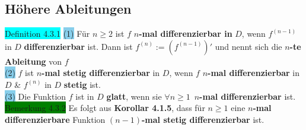 \documentclass[landscape, 10pt]{article}
\begin{document}
\begin{multicols}{3}
       \subsection{Höhere Ableitungen}
              \colorbox{cyan}{Definition 4.3.1} 
                     \colorbox{SkyBlue}{(1)}
                            Für \textcolor{NavyBlue}{
                            $n\geqslant2$} ist 
                            \textcolor{NavyBlue}{$f$}
                            $n$\textbf{-mal differenzierbar 
                            in} \textcolor{NavyBlue}{$D$}, wenn 
                            \textcolor{NavyBlue}{
                            $f^{(n-1)}$} in 
                            \textcolor{NavyBlue}{$D$}
                            \textbf{differenzierbar} ist. 
                            Dann ist 
                            \textcolor{NavyBlue}{
                            $f^{(n)}:=(f^{(n-1)})'$} 
                            und nennt sich die 
                            $n$\textbf{-te Ableitung} von 
                            \textcolor{NavyBlue}{$f$}\\
                     \colorbox{SkyBlue}{(2)} 
                            \textcolor{NavyBlue}{$f$} 
                            ist $n$\textbf{-mal stetig 
                            differenzierbar} in 
                            \textcolor{NavyBlue}{$D$}, 
                            wenn \textcolor{NavyBlue}{$f$} 
                            \textbf{$n$-mal differenzierbar} in
                            \textcolor{NavyBlue}{$D$}
                            \& \textcolor{NavyBlue}{$f^{(n)}$} 
                            in \textcolor{NavyBlue}{$D$} 
                            \textbf{stetig} ist.\\
                     \colorbox{SkyBlue}{(3)} 
                            Die Funktion \textcolor{NavyBlue}{$f$} 
                            ist in \textcolor{NavyBlue}{$D$} 
                            \textbf{glatt}, wenn sie 
                            \textcolor{NavyBlue}{
                            $\forall n\geqslant1$}\,
                            \textbf{$n$-mal 
                            differenzierbar} ist.\\
              \colorbox{green}{Bemerkung 4.3.2} 
                     Es folgt aus \textbf{Korollar 4.1.5}, 
                     dass für 
                     \textcolor{NavyBlue}{$n\geqslant1$} eine 
                     \textbf{$n$-mal differenzierbare}
                     Funktion \textbf{$(n-1)$-mal 
                     stetig differenzierbar} ist.\\

\end{multicols}
\end{document}
